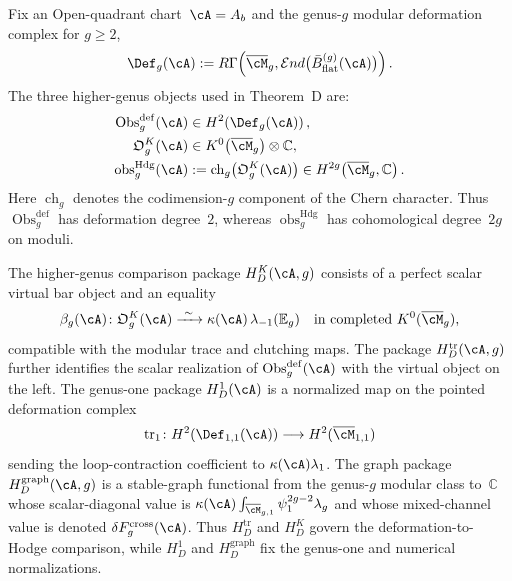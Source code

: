 \begin{definition}
\label{def:genus-g-obstruction}
Fix an Open-quadrant chart~$\cA=A_b$ and the genus-$g$ modular
deformation complex for $g\geq2$,
\[
 \Def_g(\cA)
 :=R\Gamma\!\left(\overline{\cM}_g,
 \mathcal E nd\bigl(\bar B^{(g)}_{\mathrm{flat}}(\cA)\bigr)\right).
\]
The three higher-genus objects used in Theorem~D are:
\begin{align}
 \operatorname{Obs}^{\mathrm{def}}_g(\cA)
 &\in H^2\!\left(\Def_g(\cA)\right),
 \label{eq:obs-g-projection}\\
 \mathfrak O^K_g(\cA)
 &\in K^0\!\left(\overline{\cM}_g\right)\otimes\mathbb C,\\
 \operatorname{obs}^{\mathrm{Hdg}}_g(\cA)
 &:=\operatorname{ch}_g\!\left(\mathfrak O^K_g(\cA)\right)
 \in H^{2g}\!\left(\overline{\cM}_g,\mathbb C\right).
\end{align}
Here $\operatorname{ch}_g$ denotes the codimension-$g$ component of
the Chern character.  Thus
$\operatorname{Obs}^{\mathrm{def}}_g$ has deformation degree~$2$,
whereas $\operatorname{obs}^{\mathrm{Hdg}}_g$ has cohomological
degree~$2g$ on moduli.

The higher-genus comparison package $H_D^K(\cA,g)$ consists of a
perfect scalar virtual bar object and an equality
\[
 \beta_g(\cA)\colon
 \mathfrak O^K_g(\cA)
 \xrightarrow{\ \sim\ }
 \kappa(\cA)\,\lambda_{-1}(\mathbb E_g)
 \quad\text{in completed }K^0(\overline{\cM}_g),
\]
compatible with the modular trace and clutching maps.  The package
$H_D^{\mathrm{tr}}(\cA,g)$ further identifies the scalar realization
of $\operatorname{Obs}^{\mathrm{def}}_g(\cA)$ with the virtual object
on the left.  The genus-one package $H_D^1(\cA)$ is a normalized map
on the pointed deformation complex
\[
 \operatorname{tr}_1\colon H^2(\Def_{1,1}(\cA))
 \longrightarrow H^2(\overline{\cM}_{1,1})
\]
sending the loop-contraction coefficient to
$\kappa(\cA)\lambda_1$.  The graph package
$H_D^{\mathrm{graph}}(\cA,g)$ is a stable-graph functional from the
genus-$g$ modular class to~$\mathbb C$ whose scalar-diagonal value is
$\kappa(\cA)\int_{\overline{\cM}_{g,1}}
\psi_1^{2g-2}\lambda_g$ and whose mixed-channel value is denoted
$\delta F_g^{\mathrm{cross}}(\cA)$.  Thus $H_D^{\mathrm{tr}}$ and
$H_D^K$ govern the deformation-to-Hodge comparison, while $H_D^1$
and $H_D^{\mathrm{graph}}$ fix the genus-one and numerical
normalizations.
\end{definition}

